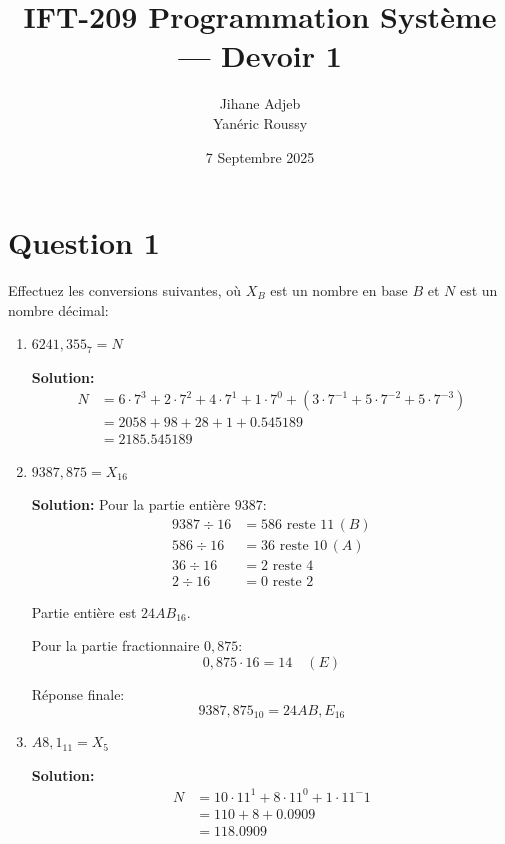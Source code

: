 \documentclass{article}
\title{IFT-209 Programmation Système — Devoir 1}
\author{Jihane Adjeb \\ Yanéric Roussy}
\date{7 Septembre 2025}
\begin{document}
\maketitle

\section*{Question 1}
Effectuez les conversions suivantes, où $X_B$ est un nombre en base $B$ et $N$ est un
nombre décimal:

\begin{enumerate}[label=\alph*), itemsep=2em]
    \item $6241,355_{7} = N$
    
    \textbf{Solution:}
    \[
    \begin{aligned}
    N &= 6 \cdot 7^3 + 2 \cdot 7^2 + 4 \cdot 7^1 + 1 \cdot 7^0 + \left(3 \cdot 7^{-1} + 5 \cdot 7^{-2} + 5 \cdot 7^{-3}\right) \\
    &= 2058 + 98 + 28 + 1 + 0.545189 \\
    &= 2185.545189
    \end{aligned}
    \]

    \item $9387,875 = X_{16}$
    
    \textbf{Solution:}
    Pour la partie entière $9387$:
    \[
    \begin{aligned}
    9387 \div 16 &= 586 \text{ reste } 11 \, (B) \\
    586 \div 16 &= 36 \text{ reste } 10 \, (A) \\
    36 \div 16 &= 2 \text{ reste } 4 \\
    2 \div 16 &= 0 \text{ reste } 2
    \end{aligned}
    \]

    Partie entière est $24AB_{16}$.

    Pour la partie fractionnaire $0,875$:
    \[
    0,875 \cdot 16 = 14 \quad (E)
    \]
    
    Réponse finale:
    \[
    9387,875_{10} = 24AB,E_{16}
    \]

    \newpage

    \item $A8,1_{11} = X_{5}$
    
    \textbf{Solution:}
    \[
    \begin{aligned}
    N &= 10 \cdot 11^1 + 8 \cdot 11^0 + 1 \cdot 11^-1 \\
    &= 110 + 8 + 0.0909 \\
    &= 118.0909
    \end{aligned}
    \]
    

\end{enumerate}
\end{document}
